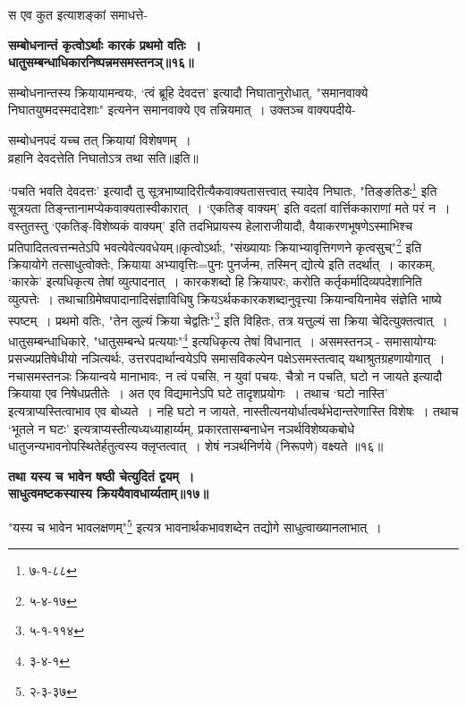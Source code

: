 {{स एव कुत इत्याशङ्कां समाधत्ते-
\begin{center}{\bfseries सम्बोधनान्तं कृत्वोऽर्थाः कारकं प्रथमो वतिः~।\\
 धातुसम्बन्धाधिकारनिष्पन्नमसमस्तनञ्॥१६॥}
\end{center}
सम्बोधनान्तस्य क्रियायामन्वयः, `त्वं ब्रूहि देवदत्त' इत्यादौ निघातानुरोधात्, "समानवाक्ये निघातयुष्मदस्मदादेशाः" इत्यनेन समानवाक्ये एव तन्नियमात्~।
उक्तञ्च वाक्यपदीये-
\begin{center} सम्बोधनपदं यच्च तत् क्रियायां विशेषणम्~।\\
 व्रहानि देवदत्तेति निघातोऽत्र तथा सति॥इति॥
\end{center} `पचति भवति देवदत्तः' इत्यादौ तु सूत्रभाष्यादिरीत्यैकवाक्यतासत्त्वात् स्यादेव निघातः, "तिङ्ङतिडः\footnote{७-१-८८} इति सूत्रयता तिङ्न्तानामप्येकवाक्यतास्वीकारात्~।
`एकतिङ् वाक्यम्' इति वदतां
 वार्त्तिककाराणां मते परं न~।
वस्तुतस्तु `एकतिङ्-विशेष्यकं वाक्यम्' इति तदभिप्रायस्य हेलाराजीयादौ, वैयाकरणभूषणेऽस्माभिश्च प्रतिपादितत्वत्तन्मतेऽपि भवत्येवेत्यवधेयम्॥कृत्वोऽर्थाः,
 "संख्यायाः क्रियाभ्यावृत्तिगणने कृत्वसुच्"\footnote{५-४-१७} इति क्रियायोगे तत्साधुत्वोक्तेः, क्रियाया अभ्यावृत्तिः=पुनः पुनर्जन्म, तस्मिन् द्योत्ये इति तदर्थात्~।
 कारकम्, `कारके' इत्यधिकृत्य तेषां व्युत्पादनात्~।
कारकशब्दो हि क्रियापरः, करोति कर्तृकर्मादिव्यपदेशानिति व्युत्पत्तेः~।
तथाचाग्रिमेष्वपादानादिसंज्ञाविधिषु क्रियऽर्थककारकशब्दानुवृत्त्या क्रियान्वयिनामेव संज्ञेति भाष्ये स्पष्टम्~।
 प्रथमो वतिः, "तेन लुल्यं क्रिया चेद्वतिः"\footnote{५-१-११४} इति विहितः, तत्र यत्तुल्यं सा क्रिया चेदित्युक्तत्वात्~।
धातुसम्बन्धाधिकारे, "धातुसम्बन्धे प्रत्ययाः"\footnote{३-४-१} इत्यधिकृत्य तेषां विधानात्~।
 असमस्तनञ् - समासायोग्यः प्रसज्यप्रतिषेधीयो नञित्यर्थः, उत्तरपदार्थान्वयेऽपि समासविकल्पेन पक्षेऽसमस्तत्वाद् यथाश्रुतग्रहणायोगात्~।
 नचासमस्तनञः क्रियान्वये मानाभावः, न त्वं पचसि, न युवां पचयः, चैत्रो न पचति, घटो न जायते इत्यादौ क्रियाया एव निषेधप्रतीतेः~।
अत एव विद्यमानेऽपि घटे तादृशप्रयोगः~।
 तथाच `घटो नास्ति' इत्यत्राप्यस्तित्वाभाव एव बोध्यते~।
नहि घटो न जायते, नास्तीत्यनयोर्धात्वर्थभेदान्तरेणास्ति विशेषः~।
तथाच `भूतले न घटः' इत्यत्राप्यस्तीत्यध्यध्याहार्य्यम्, प्रकारतासम्बनाधेन नञर्थविशेष्यकबोधे धातुजन्यभावनोपस्थितेर्हतुत्वस्य क्लृप्तत्वात्~।
शेषं नञर्थनिर्णये (निरूपणे) वक्ष्यते ॥१६॥\par
\begin{center}{\bfseries तथा यस्य च भावेन षष्ठी चेत्युदितं द्वयम्~।\\
 साधुत्वमष्टकस्यास्य क्रिययैवावधार्य्यताम्॥१७॥}\end{center}
 "यस्य च भावेन भावलक्षणम्"\footnote{२-३-३७} इत्यत्र भावनार्थकभावशब्देन तद्योगे साधुत्वाख्यानलाभात्~।
}}
